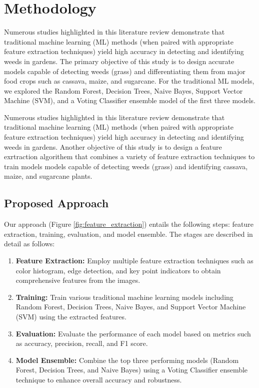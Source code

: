 \documentclass[10pt,twocolumn,letterpaper]{article}
\begin{document}
\section{Methodology}
Numerous studies highlighted in this literature review demonstrate that traditional machine learning (ML) methods (when paired with appropriate feature extraction techniques) yield high accuracy in detecting and identifying weeds in gardens. The primary objective of this study is to design accurate models capable of detecting weeds (grass) and differentiating them from major food crops such as cassava, maize, and sugarcane. For the traditional ML models, we explored the Random Forest, Decision Trees, Naive Bayes, Support Vector Machine (SVM), and a Voting Classifier ensemble model of the first three models.

Numerous studies highlighted in this literature review demonstrate that traditional machine learning (ML) methods (when paired with appropriate feature extraction techniques) yield high accuracy in detecting and identifying weeds in gardens. Another objective of this study is to design a feature exrtraction algorithem that combines a variety of feature extraction techniques to train models models capable of detecting weeds (grass) and identifying cassava, maize, and sugarcane plants. 

\subsection{Proposed Approach}
Our approach (Figure \ref{fig:feature_extraction}) entails the following steps: feature extraction, training, evaluation, and model ensemble. The stages are described in detail as follows:

\begin{enumerate}
    \item \textbf{Feature Extraction:} Employ multiple feature extraction techniques such as color histogram, edge detection, and key point indicators to obtain comprehensive features from the images.
    \item \textbf{Training:} Train various traditional machine learning models including Random Forest, Decision Trees, Naive Bayes, and Support Vector Machine (SVM) using the extracted features.
    \item \textbf{Evaluation:} Evaluate the performance of each model based on metrics such as accuracy, precision, recall, and F1 score.
    \item \textbf{Model Ensemble:} Combine the top three performing models (Random Forest, Decision Trees, and Naive Bayes) using a Voting Classifier ensemble technique to enhance overall accuracy and robustness.
\end{enumerate}
\end{document}
